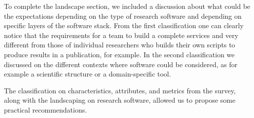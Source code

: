 To complete the landscape section, we included a discussion about what could be the expectations depending on the type of research software and depending on specific layers of the software stack. From the first classification one can clearly notice that the requirements for a team to build a complete services and very different from those of individual researchers who builds their own scripts to produce results in a publication, for example. In the second classification we discussed on the different contexts where software could be considered, as for example a scientific structure or a domain-specific tool.

The classification on characteristics, attributes, and metrics from the survey, along with the landscaping on research software, allowed us to propose some practical recommendations.
